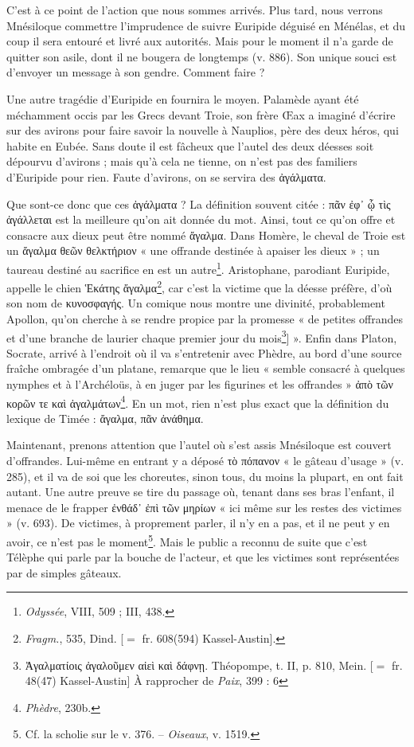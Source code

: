 \documentclass{book}%
\newcommand{\italique}[1]{\textit{#1}}%
\newcommand{\note}[1]{\footnote{#1}}
\begin{document}
C'est à ce point de l'action que nous sommes arrivés. Plus tard, nous verrons Mnésiloque commettre l'imprudence de suivre Euripide déguisé en Ménélas, et du coup il sera entouré et livré aux autorités. Mais pour le moment il n'a garde de quitter son asile, dont il ne bougera de longtemps (v. 886). 
Son unique souci est d'envoyer un message à son gendre. Comment faire ? 

Une autre tragédie d'Euripide en fournira le moyen. Palamède ayant été méchamment occis par les Grecs devant Troie, son frère Œax a imaginé d'écrire sur des avirons pour faire savoir la nouvelle à Nauplios, père des deux héros, qui habite en Eubée. Sans doute il est fâcheux que l'autel des deux déesses soit dépourvu d'avirons ; mais qu'à cela ne tienne, on n'est pas des familiers d'Euripide pour rien. Faute d'avirons, on se servira des ἀγάλματα. 

Que sont-ce donc que ces ἀγάλματα ? La définition souvent citée : πᾶν ἐφ᾽ ᾧ τὶς ἀγάλλεται est la meilleure qu'on ait donnée du mot. 
Ainsi, tout ce qu'on offre et consacre aux dieux peut être nommé ἄγαλμα. 
Dans Homère, le cheval de Troie est un ἄγαλμα θεῶν θελκτήριον « une offrande destinée à apaiser les dieux » ; un taureau destiné au sacrifice en est un autre\note{\italique{Odyssée}, VIII, 509 ; III, 438.}. Aristophane, parodiant Euripide, appelle le chien Ἑκάτης ἄγαλμα\note{\italique{Fragm.}, 535, Dind. [$=$ fr. 608(594) Kassel-Austin].}, car c'est la victime que la déesse préfère, d'où son nom de κυνοσφαγής. Un comique nous montre une divinité, probablement Apollon, qu'on cherche à se rendre propice par la promesse « de petites offrandes et d'une branche de laurier chaque premier jour du mois\note{Ἀγαλματίοις ἀγαλοῦμεν αἰεὶ καὶ δάφνῃ. Théopompe, t. II, p. 810, Mein. [$=$ fr. 48(47) Kassel-Austin] À rapprocher de \italique{Paix}, 399 : 6}] ». 
Enfin dans Platon, Socrate, arrivé à l'endroit où il va s'entretenir avec Phèdre, au bord d'une source fraîche ombragée d'un platane, remarque que le lieu « semble consacré à quelques nymphes et à l'Archéloüs, à en juger par les figurines et les offrandes » ἀπὸ τῶν κορῶν τε καὶ ἀγαλμάτων\note{\italique{Phèdre}, 230b.}. 
En un mot, rien n'est plus exact que la définition du lexique de Timée : ἄγαλμα, πᾶν ἀνάθημα. 

Maintenant, prenons attention que l'autel où s'est assis Mnésiloque est couvert d'offrandes. Lui-même en entrant y a déposé τὸ πόπανον « le gâteau d'usage » (v. 285), et il va de soi que les choreutes, sinon tous, du moins la plupart, en ont fait autant. Une autre preuve se tire du passage où, tenant dans ses bras l'enfant, il menace de le frapper ἐνθάδ᾽ ἐπὶ τῶν μηρίων « ici même sur les restes des victimes » (v. 693). 
De victimes, à proprement parler, il n'y en a pas, et il ne peut y en avoir, ce n'est pas le moment\note{Cf. la scholie sur le v. 376. -- \italique{Oiseaux}, v. 1519.}. Mais le public a reconnu de suite que c'est Télèphe qui parle par la bouche de l'acteur, et que les victimes sont représentées par de simples gâteaux.
\end{document}
